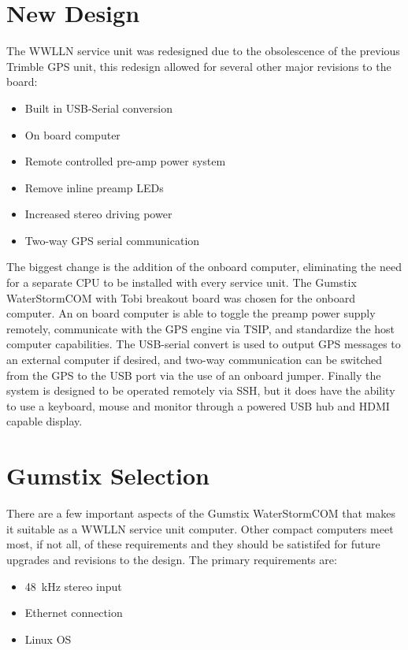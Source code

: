 \section{New Design}

The WWLLN service unit was redesigned due to the obsolescence of the previous Trimble GPS unit, this redesign allowed for several other major revisions to the board:

\begin{itemize}
\item{Built in USB-Serial conversion}
\item{On board computer}
\item{Remote controlled pre-amp power system}
\item{Remove inline preamp LEDs}
\item{Increased stereo driving power}
\item{Two-way GPS serial communication}
\end{itemize}

The biggest change is the addition of the onboard computer, eliminating the need for a separate CPU to be installed with every service unit.
The Gumstix WaterStormCOM with Tobi breakout board was chosen for the onboard computer.
An on board computer is able to toggle the preamp power supply remotely, communicate with the GPS engine via TSIP, and standardize the host computer capabilities.
The USB-serial convert is used to output GPS messages to an external computer if desired, and two-way communication can be switched from the GPS to the USB port via the use of an onboard jumper.
Finally the system is designed to be operated remotely via SSH, but it does have the ability to use a keyboard, mouse and monitor through a powered USB hub and HDMI capable display.

\section{Gumstix Selection}

There are a few important aspects of the Gumstix WaterStormCOM that makes it suitable as a WWLLN service unit computer.
Other compact computers meet most, if not all, of these requirements and they should be satistifed for future upgrades and revisions to the design.
The primary requirements are:

\begin{itemize}
\item{48~kHz stereo input}
\item{Ethernet connection}
\item{Linux OS}
\end{itemize}

